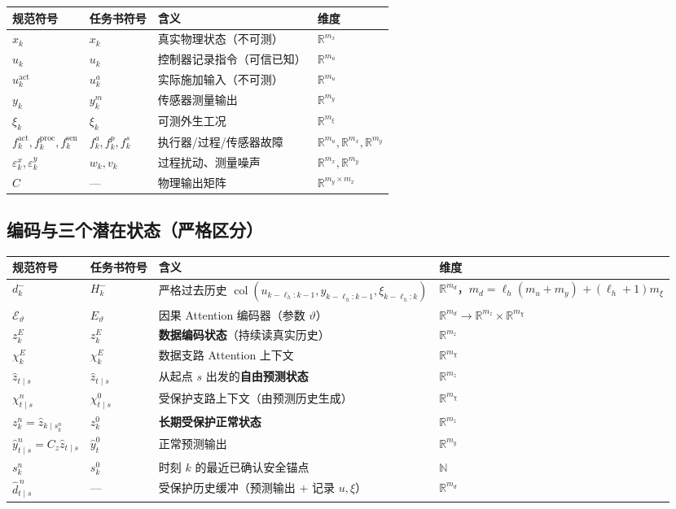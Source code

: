\documentclass[11pt,a4paper]{ctexart}
\theoremstyle{remark}
\newcommand{\col}{\operatorname{col}}
\newcommand{\R}{\mathbb{R}}
\newcommand{\Enc}{\mathcal{E}_{\vartheta}}
\begin{document}
\begin{longtable}{L{0.24\textwidth}L{0.14\textwidth}L{0.34\textwidth}L{0.16\textwidth}}
\toprule
规范符号 & 任务书符号 & 含义 & 维度 \\
\midrule
\endhead
$x_k$ & $x_k$ & 真实物理状态（不可测） & $\R^{m_x}$ \\
$u_k$ & $u_k$ & 控制器记录指令（可信已知） & $\R^{m_u}$ \\
$u^{\mathrm{act}}_k$ & $u_k^a$ & 实际施加输入（不可测） & $\R^{m_u}$ \\
$y_k$ & $y_k^m$ & 传感器测量输出 & $\R^{m_y}$ \\
$\xi_k$ & $\xi_k$ & 可测外生工况 & $\R^{m_\xi}$ \\
$f^{\mathrm{act}}_k,f^{\mathrm{proc}}_k,f^{\mathrm{sen}}_k$ & $f_k^a,f_k^p,f_k^s$ & 执行器/过程/传感器故障 & $\R^{m_u},\R^{m_x},\R^{m_y}$ \\
$\varepsilon^x_k,\varepsilon^y_k$ & $w_k,v_k$ & 过程扰动、测量噪声 & $\R^{m_x},\R^{m_y}$ \\
$C$ & --- & 物理输出矩阵 & $\R^{m_y\times m_x}$ \\
\bottomrule
\end{longtable}

\subsection{编码与三个潜在状态（严格区分）}

\begin{longtable}{L{0.24\textwidth}L{0.11\textwidth}L{0.37\textwidth}L{0.16\textwidth}}
\toprule
规范符号 & 任务书符号 & 含义 & 维度 \\
\midrule
\endhead
$d^-_k$ & $H_k^-$ & 严格过去历史 $\col(u_{k-\ell_h:k-1},y_{k-\ell_h:k-1},\xi_{k-\ell_h:k})$ & $\R^{m_d}$，\newline $m_d=\ell_h(m_u{+}m_y)$ \newline $+\,(\ell_h{+}1)m_\xi$ \\
$\Enc$ & $E_\vartheta$ & 因果 Attention 编码器（参数 $\vartheta$） & $\R^{m_d}\to\R^{m_z}\times\R^{m_\chi}$ \\
$z^E_k$ & $z_k^E$ & \textbf{数据编码状态}（持续读真实历史） & $\R^{m_z}$ \\
$\chi^E_k$ & $\chi_k^E$ & 数据支路 Attention 上下文 & $\R^{m_\chi}$ \\
$\hat z_{t\mid s}$ & $\hat z_{t\mid s}$ & 从起点 $s$ 出发的\textbf{自由预测状态} & $\R^{m_z}$ \\
$\chi^n_{t\mid s}$ & $\chi_{t\mid s}^0$ & 受保护支路上下文（由预测历史生成） & $\R^{m_\chi}$ \\
$z^n_k=\hat z_{k\mid s^n_k}$ & $z_k^0$ & \textbf{长期受保护正常状态} & $\R^{m_z}$ \\
$\hat y^n_{t\mid s}=C_z\hat z_{t\mid s}$ & $\hat y_t^0$ & 正常预测输出 & $\R^{m_y}$ \\
$s^n_k$ & $s_k^0$ & 时刻 $k$ 的最近已确认安全锚点 & $\mathbb N$ \\
$\hat d^{\,n}_{t\mid s}$ & --- & 受保护历史缓冲（预测输出 + 记录 $u,\xi$） & $\R^{m_d}$ \\
\bottomrule
\end{longtable}
\end{document}
